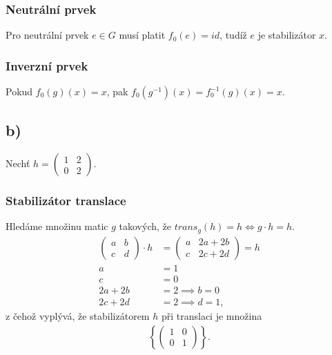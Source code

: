 \documentclass{scrartcl}
\begin{document}
    \subsubsection*{Neutrální prvek}
    Pro neutrální prvek $e \in G$ musí platit $f_0(e) = id$, tudíž $e$ je stabilizátor $x$. 
    \subsubsection*{Inverzní prvek}
    Pokud $f_0(g)(x) = x$, pak $f_0(g^{-1})(x) = f_0^{-1}(g)(x) = x$.

    \subsection*{b)}
    Nechť $h = \begin{pmatrix}
        1 & 2 \\
        0 & 2
    \end{pmatrix}$.
    \subsubsection*{Stabilizátor translace}
    Hledáme množinu matic $g$ takových, že $trans_g(h) = h \Leftrightarrow  g\cdot h = h$. 
    \begin{align*}
        \begin{pmatrix}
            a & b \\
            c & d
        \end{pmatrix} \cdot h &= 
        \begin{pmatrix}
            a & 2a+2b \\
            c & 2c+2d
        \end{pmatrix} = h \\
        a &= 1 \\
        c &= 0 \\
        2a+2b &= 2 \implies b = 0 \\
        2c+2d &= 2 \implies d = 1,
    \end{align*}
    z čehož vyplývá, že stabilizátorem $h$ při translaci je množina 
    \begin{align*}
        \left\{
            \begin{pmatrix}
                1 & 0 \\
                0 & 1
            \end{pmatrix}
        \right\}.
    \end{align*}
\end{document}
